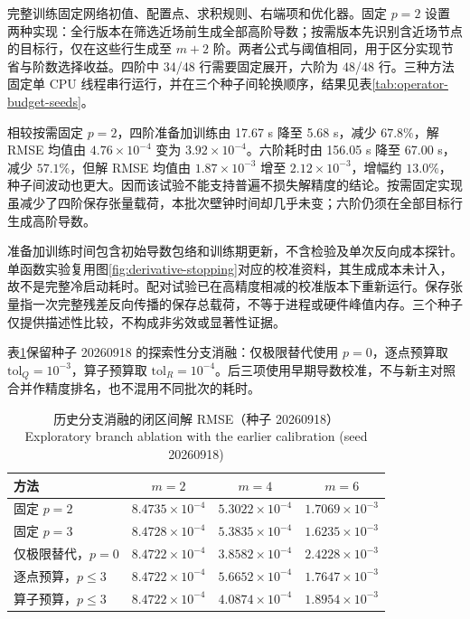 \documentclass[UTF8,fontset=none,10.5pt,a4paper]{ctexart}
\numberwithin{equation}{section}
\begin{document}
完整训练固定网络初值、配置点、求积规则、右端项和优化器。固定 $p=2$ 设置两种实现：全行版本在筛选近场前生成全部高阶导数；按需版本先识别含近场节点的目标行，仅在这些行生成至 $m+2$ 阶。两者公式与阈值相同，用于区分实现节省与阶数选择收益。四阶中 34/48 行需要固定展开，六阶为 48/48 行。三种方法固定单 CPU 线程串行运行，并在三个种子间轮换顺序，结果见表\ref{tab:operator-budget-seeds}。



相较按需固定 $p=2$，四阶准备加训练由 17.67 s 降至 5.68 s，减少 $67.8\%$，解 RMSE 均值由 $4.76\times10^{-4}$ 变为 $3.92\times10^{-4}$。六阶耗时由 156.05 s 降至 67.00 s，减少 $57.1\%$，但解 RMSE 均值由 $1.87\times10^{-3}$ 增至 $2.12\times10^{-3}$，增幅约 $13.0\%$，种子间波动也更大。因而该试验不能支持普遍不损失解精度的结论。按需固定实现虽减少了四阶保存张量载荷，本批次壁钟时间却几乎未变；六阶仍须在全部目标行生成高阶导数。

准备加训练时间包含初始导数包络和训练期更新，不含检验及单次反向成本探针。单函数实验复用图\ref{fig:derivative-stopping}对应的校准资料，其生成成本未计入，故不是完整冷启动耗时。配对试验已在高精度相减的校准版本下重新运行。保存张量指一次完整残差反向传播的保存总载荷，不等于进程或硬件峰值内存。三个种子仅提供描述性比较，不构成非劣效或显著性证据。

表\ref{tab:end-to-end}保留种子 20260918 的探索性分支消融：仅极限替代使用 $p=0$，逐点预算取 $\mathrm{tol}_Q=10^{-3}$，算子预算取 $\mathrm{tol}_R=10^{-4}$。后三项使用早期导数校准，不与新主对照合并作精度排名，也不混用不同批次的耗时。

\begin{table}[H]
\centering
\caption{历史分支消融的闭区间解 RMSE（种子 20260918）\\Exploratory branch ablation with the earlier calibration (seed 20260918)}
\label{tab:end-to-end}
\small
\begin{tabular}{lccc}
\toprule
方法 & $m=2$ & $m=4$ & $m=6$\\
\midrule
固定 $p=2$ & $8.4735\times10^{-4}$ & $5.3022\times10^{-4}$ & $1.7069\times10^{-3}$\\
固定 $p=3$ & $8.4728\times10^{-4}$ & $5.3835\times10^{-4}$ & $1.6235\times10^{-3}$\\
仅极限替代，$p=0$ & $8.4722\times10^{-4}$ & $3.8582\times10^{-4}$ & $2.4228\times10^{-3}$\\
逐点预算，$p\le3$ & $8.4722\times10^{-4}$ & $5.6652\times10^{-4}$ & $1.7647\times10^{-3}$\\
算子预算，$p\le3$ & $8.4722\times10^{-4}$ & $4.0874\times10^{-4}$ & $1.8954\times10^{-3}$\\
\bottomrule
\end{tabular}
\end{table}
\end{document}
